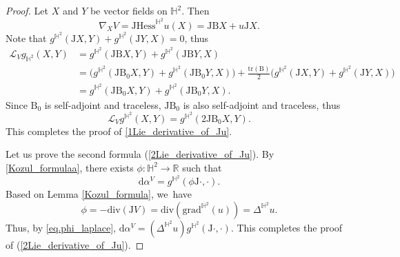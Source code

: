 \documentclass[JEP,XML,SOM,Unicode,NoEqCountersInSection, NoFloatCountersInSection,published]{cedram}
\theoremstyle{plain}
\theoremstyle{definition}
\newcommand{\grad}{\mathrm{grad}^{\mathbb{H}^2}}
\newcommand{\hess}{\mathrm{Hess}^{\mathbb{H}^2}}
\newcommand{\J}{\mathrm{J}}
\newcommand{\B}{\mathrm{B}}
\begin{document}
\begin{proof}
Let $X$ and $Y$ be vector fields on $\mathbb{H}^2$. Then
\[
\nabla_XV=\J\hess u(X)=\J \B X+u\J X.
\]
Note that $g^{\mathbb{H}^2}(\J X,Y)+g^{\mathbb{H}^2}(\J Y,X)=0$, thus
\begin{align*}
\mathcal{L}_Vg_{\mathbb{H}^2}(X,Y)&=g^{\mathbb{H}^2}(\J\B X,Y)+g^{\mathbb{H}^2}(\J\B Y,X)\\
&=\big(g^{\mathbb{H}^2}(\J\B_0 X,Y)+g^{\mathbb{H}^2}(\J\B_0 Y,X)\big)+ \frac{\mathrm{tr}(\B)}{2}\big(g^{\mathbb{H}^2}(\J X,Y)+g^{\mathbb{H}^2}(\J Y,X)\big)\\
&=g^{\mathbb{H}^2}(\J\B_0 X,Y)+g^{\mathbb{H}^2}(\J\B_0 Y,X).
\end{align*}
Since $\B_0$ is self-adjoint and traceless, $\J\B_0 $ is also self-adjoint and traceless, thus
\begin{equation}\label{eq_50_rough_for_divergence_free}
\mathcal{L}_Vg^{\mathbb{H}^2}(X,Y)=g^{\mathbb{H}^2}(2\J\B_0 X,Y).
\end{equation} This completes the proof of \eqref{1Lie_derivative_of_Ju}.

Let us prove the second formula (\ref{2Lie_derivative_of_Ju}). By \eqref{Kozul_formulaa}, there exists \(\phi : \mathbb{H}^2 \to \mathbb{R}\) such that
\begin{equation}\label{eq.phi_laplace}
\mathrm{d}\alpha^V = g^{\mathbb{H}^2}(\phi \J \cdot, \cdot).
\end{equation}
Based on Lemma \ref{Kozul_formula}, we~have
\[ \phi = -\mathrm{div}(\J V) = \mathrm{div}(\grad(u)) =
\Delta^{\mathbb{H}^2} u. \]
Thus, by \eqref{eq.phi_laplace}, \(\mathrm{d}\alpha^V =
(\Delta^{\mathbb{H}^2} u) g^{\mathbb{H}^2}(\J \cdot, \cdot)\). This
completes the proof of (\ref{2Lie_derivative_of_Ju}).


\end{proof}
\end{document}
